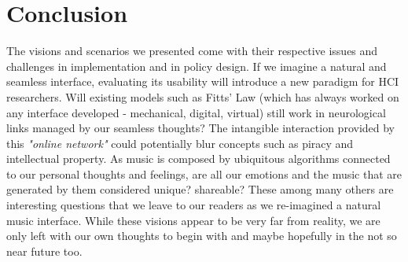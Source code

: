 \documentclass[sigchi]{acmart}
\begin{document}
\section{Conclusion}
The visions and scenarios we presented come with their respective issues and challenges in implementation and in policy design. If we imagine a natural and seamless interface, evaluating its usability will introduce a new paradigm for HCI researchers. Will existing models such as Fitts' Law (which has always worked on any interface developed - mechanical, digital, virtual) still work in neurological links managed by our seamless thoughts? The intangible interaction provided by this \textit{"online network"} could potentially blur concepts such as piracy and intellectual property. As music is composed by ubiquitous algorithms connected to our personal thoughts and feelings, are all our emotions and the music that are generated by them considered unique? shareable? These among many others are interesting questions that we leave to our readers as we re-imagined a natural music interface. While these visions appear to be very far from reality, we are only left with our own thoughts to begin with and maybe hopefully in the not so near future too. 



\end{document}
